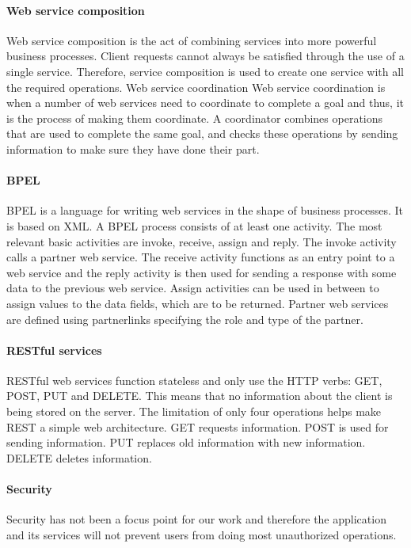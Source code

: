 \documentclass[english, a4paper, 12pt]{article}
\begin{document}
\paragraph{Web service composition}
Web service composition is the act of combining services into more powerful business processes. Client requests cannot always be satisfied through the use of a single service. Therefore, service composition is used to create one service with all the required operations.
Web service coordination
Web service coordination is when a number of web services need to coordinate to complete a goal and thus, it is the process of making them coordinate. A coordinator combines operations that are used to complete the same goal, and checks these operations by sending information to make sure they have done their part.

\paragraph{BPEL}
BPEL is a language for writing web services in the shape of business processes. It is based on XML.
A BPEL process consists of at least one activity. The most relevant basic activities are invoke, receive, assign and reply.
The invoke activity calls a partner web service. The receive activity functions as an entry point to a web service and the reply activity is then used for sending a response with some data to the previous web service. Assign activities can be used in between to assign values to the data fields, which are to be returned.
Partner web services are defined using partnerlinks specifying the role and type of the partner.

\paragraph{RESTful services}
RESTful web services function stateless and only use the HTTP verbs: GET, POST, PUT and DELETE. This means that no information about the client is being stored on the server. The limitation of only four operations helps make REST a simple web architecture.
GET requests information.
POST is used for sending information.
PUT replaces old information with new information.
DELETE deletes information.

\paragraph{Security}
Security has not been a focus point for our work and therefore the application and its services will not prevent users from doing most unauthorized operations.
\end{document}

